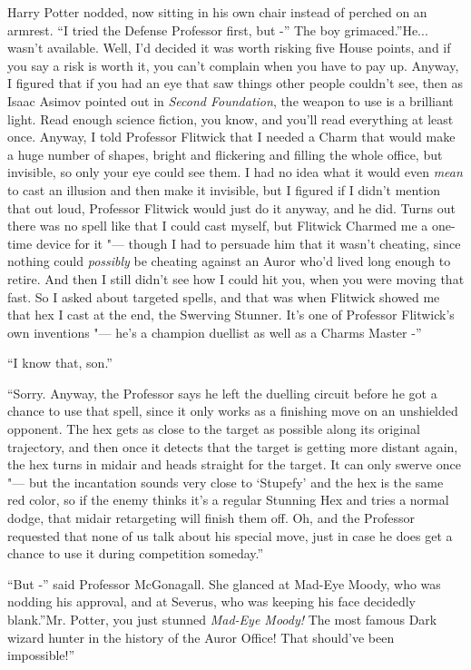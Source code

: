 Harry Potter nodded, now sitting in his own chair instead of perched on
an armrest. ``I tried the Defense Professor first, but -'' The boy
grimaced.''He... wasn't available. Well, I'd decided it was worth
risking five House points, and if you say a risk is worth it, you can't
complain when you have to pay up. Anyway, I figured that if you had an
eye that saw things other people couldn't see, then as Isaac Asimov
pointed out in \emph{Second Foundation}, the weapon to use is a
brilliant light. Read enough science fiction, you know, and you'll read
everything at least once. Anyway, I told Professor Flitwick that I
needed a Charm that would make a huge number of shapes, bright and
flickering and filling the whole office, but invisible, so only your eye
could see them. I had no idea what it would even \emph{mean} to cast an
illusion and then make it invisible, but I figured if I didn't mention
that out loud, Professor Flitwick would just do it anyway, and he did.
Turns out there was no spell like that I could cast myself, but Flitwick
Charmed me a one-time device for it "--- though I had to persuade him that
it wasn't cheating, since nothing could \emph{possibly} be cheating
against an Auror who'd lived long enough to retire. And then I still
didn't see how I could hit you, when you were moving that fast. So I
asked about targeted spells, and that was when Flitwick showed me that
hex I cast at the end, the Swerving Stunner. It's one of Professor
Flitwick's own inventions "--- he's a champion duellist as well as a Charms
Master -''

``I know that, son.''

``Sorry. Anyway, the Professor says he left the duelling circuit before
he got a chance to use that spell, since it only works as a finishing
move on an unshielded opponent. The hex gets as close to the target as
possible along its original trajectory, and then once it detects that
the target is getting more distant again, the hex turns in midair and
heads straight for the target. It can only swerve once "--- but the
incantation sounds very close to `Stupefy' and the hex is the same red
color, so if the enemy thinks it's a regular Stunning Hex and tries a
normal dodge, that midair retargeting will finish them off. Oh, and the
Professor requested that none of us talk about his special move, just in
case he does get a chance to use it during competition someday.''

``But -'' said Professor McGonagall. She glanced at Mad-Eye Moody, who
was nodding his approval, and at Severus, who was keeping his face
decidedly blank.''Mr. Potter, you just stunned \emph{Mad-Eye Moody!} The
most famous Dark wizard hunter in the history of the Auror Office! That
should've been impossible!''

